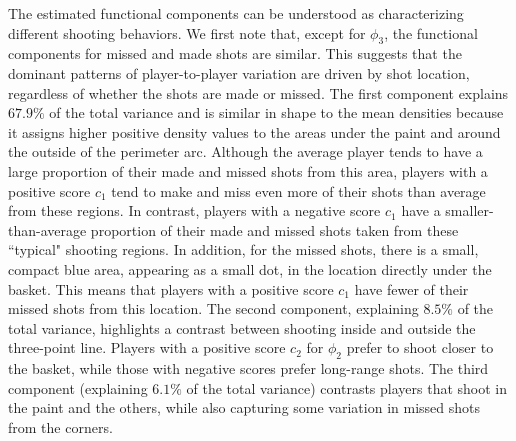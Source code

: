 The estimated functional components can be understood as characterizing different shooting behaviors. We first note that, except for $\phi_3$, the functional components for missed and made shots are similar.
	This suggests that the dominant patterns of player-to-player variation are driven by shot location, regardless of whether the shots are made or missed.
	The first component explains $67.9\%$ of the total variance and is similar in shape to the mean densities because it assigns higher positive density values to the areas under the paint and around the outside of the perimeter arc.
		Although the average player tends to have a large proportion of their made and missed shots from this area, players with a positive score $c_1$ tend to make and miss even more of their shots than average from these regions.
        In contrast, players with a negative score $c_1$ have a smaller-than-average proportion of their made and missed shots taken from these ``typical" shooting regions.
		In addition, for the missed shots, there is a small, compact blue area, appearing as a small dot, in the location directly under the basket.
		This means that players with a positive score $c_1$ have fewer of their missed shots from this location.
The second component, explaining $8.5\%$ of the total variance, highlights a contrast between shooting inside and outside the three-point line.
Players with a positive score $c_2$ for $\phi_2$ prefer to shoot closer to the basket, while those with negative scores prefer long-range shots.
	The third component (explaining $6.1\%$ of the total variance) contrasts players that shoot in the paint and the others, while also capturing some variation in missed shots from the corners.
